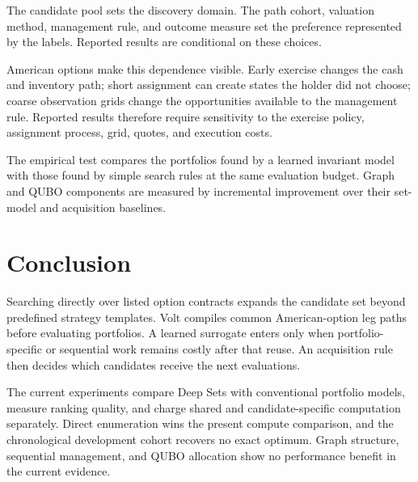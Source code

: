 \documentclass{strategynet-journal}
\newcommand{\VOLT}{\textsf{Volt}}
\begin{document}
\begin{SNcolumns}
The candidate pool sets the discovery domain.  The path cohort, valuation
method, management rule, and outcome measure set the preference represented by
the labels.  Reported results are conditional on these choices.

American options make this dependence visible.  Early exercise changes the
cash and inventory path; short assignment can create states the holder did not
choose; coarse observation grids change the opportunities available to the
management rule.  Reported results therefore require sensitivity to the
exercise policy, assignment process, grid, quotes, and execution costs.

The empirical test compares the portfolios found by a learned invariant model
with those found by simple search rules at the same evaluation budget.  Graph
and QUBO components are measured by incremental improvement over their
set-model and acquisition baselines.

\section{Conclusion}

Searching directly over listed option contracts expands the candidate set
beyond predefined strategy templates.  \VOLT{} compiles common American-option
leg paths before evaluating portfolios.  A learned surrogate enters only when
portfolio-specific or sequential work remains costly after that reuse.  An
acquisition rule then decides which candidates receive the next evaluations.

The current experiments compare Deep Sets with conventional portfolio models,
measure ranking quality, and charge shared and candidate-specific computation
separately.  Direct enumeration wins the present compute comparison, and the
chronological development cohort recovers no exact optimum.  Graph structure,
sequential management, and QUBO allocation show no performance benefit in the
current evidence.

\end{SNcolumns}
\end{document}
